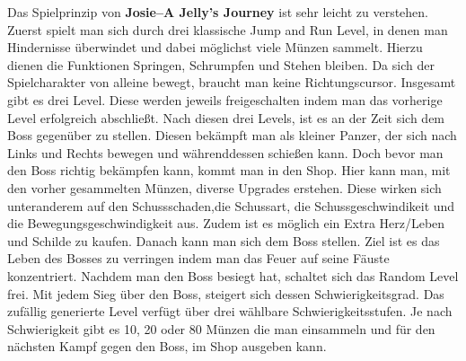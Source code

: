\documentclass[12pt,oneside,a4paper,parskip]{scrbook}
\newcommand{\gamename}{\textbf{Josie--A Jelly's Journey }}
\begin{document}
Das Spielprinzip von \gamename ist sehr leicht zu verstehen. Zuerst spielt man sich durch drei klassische Jump and Run Level, in denen man Hindernisse überwindet und dabei möglichst viele Münzen sammelt. Hierzu dienen die Funktionen Springen, Schrumpfen und Stehen bleiben. Da sich der Spielcharakter von alleine bewegt, braucht man keine Richtungscursor. Insgesamt gibt es drei Level. Diese werden jeweils freigeschalten indem man das vorherige Level erfolgreich abschließt. Nach diesen drei Levels, ist es an der Zeit sich dem Boss gegenüber zu stellen. Diesen bekämpft man als kleiner Panzer, der sich nach Links und Rechts bewegen und währenddessen schießen kann. Doch bevor man den Boss richtig bekämpfen kann, kommt man in den Shop. Hier kann man, mit den vorher gesammelten Münzen, diverse Upgrades erstehen. Diese wirken sich unteranderem auf den Schussschaden,die Schussart, die Schussgeschwindikeit und die Bewegungsgeschwindigkeit aus. Zudem ist es möglich ein Extra Herz/Leben und Schilde zu kaufen. Danach kann man sich dem Boss stellen. Ziel ist es das Leben des Bosses zu verringen indem man das Feuer auf seine Fäuste konzentriert. Nachdem man den Boss besiegt hat, schaltet sich das Random Level frei. Mit jedem Sieg über den Boss, steigert sich dessen Schwierigkeitsgrad. Das zufällig generierte Level verfügt über drei wählbare Schwierigkeitsstufen. Je nach Schwierigkeit gibt es 10, 20 oder 80 Münzen die man einsammeln und für den nächsten Kampf gegen den Boss, im Shop ausgeben kann. 


\tableofcontents										



\mainmatter









\backmatter

\listoffigures
{}			


\lstlistoflistings
{}				

\printbibliography
{}				
\end{document}

